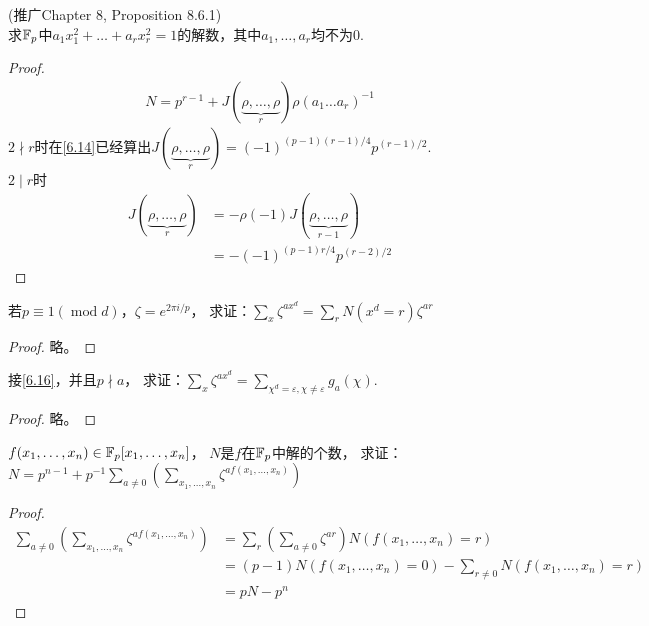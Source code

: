 \begin{exercise}\label{6.15}
    (推广Chapter 8, Proposition 8.6.1)\\
    求$\mathbb{F}_p$中$a_1x_1^2+\ldots+a_rx_r^2=1$的解数，其中$a_1,\ldots,a_r$均不为$0$.
\end{exercise}
\begin{proof}
    \begin{align*}
        N=p^{r-1}+J(\underbrace{\rho,\ldots,\rho}_{r})\rho(a_1\ldots a_r)^{-1}
    \end{align*}
    $2\nmid r$时在\ref{6.14}已经算出$J(\underbrace{\rho,\ldots,\rho}_{r})=(-1)^{(p-1)(r-1)/4}p^{(r-1)/2}$.\\
    $2\mid r$时
    \begin{align*}
        J(\underbrace{\rho,\ldots,\rho}_{r})
        &=-\rho(-1)J(\underbrace{\rho,\ldots,\rho}_{r-1})\\
        &=-(-1)^{(p-1)r/4}p^{(r-2)/2}
    \end{align*}
\end{proof}

\begin{exercise}\label{6.16}
 若$p\equiv1(\operatorname{mod}d)$，$\zeta=e^{2\pi i/p}$，
 求证：$\sum_{x}\zeta^{ax^d}=\sum_{r}N(x^d=r)\zeta^{ar}$
\end{exercise}
\begin{proof}
    略。
\end{proof}

\begin{exercise}\label{6.17}
 接\ref{6.16}，并且$p\nmid a$，
 求证：$\sum_{x}\zeta^{ax^d}=\sum_{\chi^d=\varepsilon,\chi\neq\varepsilon}g_a(\chi)$.
\end{exercise}
\begin{proof}
    略。
\end{proof}

\begin{exercise}\label{6.18}
    $f(x_1,\ldots,x_n)\in\mathbb{F}_p[x_1,\ldots,x_n]$，
    $N$是$f$在$\mathbb{F}_p$中解的个数，
    求证：
    $N=p^{n-1}+p^{-1}\sum_{a\neq0}\left( 
    \sum_{x_1,\ldots,x_n}\zeta^{af(x_1,\ldots,x_n)}
     \right)$
\end{exercise}
\begin{proof}
    \begin{align*}
        \sum_{a\neq0}\left( 
    \sum_{x_1,\ldots,x_n}\zeta^{af(x_1,\ldots,x_n)}
     \right)
     &=\sum_{r}\left(\sum_{a\neq0}\zeta^{ar}\right)N(f(x_1,\ldots,x_n)=r)\\
     &=(p-1)N(f(x_1,\ldots,x_n)=0)-\sum_{r\neq0}N(f(x_1,\ldots,x_n)=r)\\
     &=pN-p^n
    \end{align*}
\end{proof}

